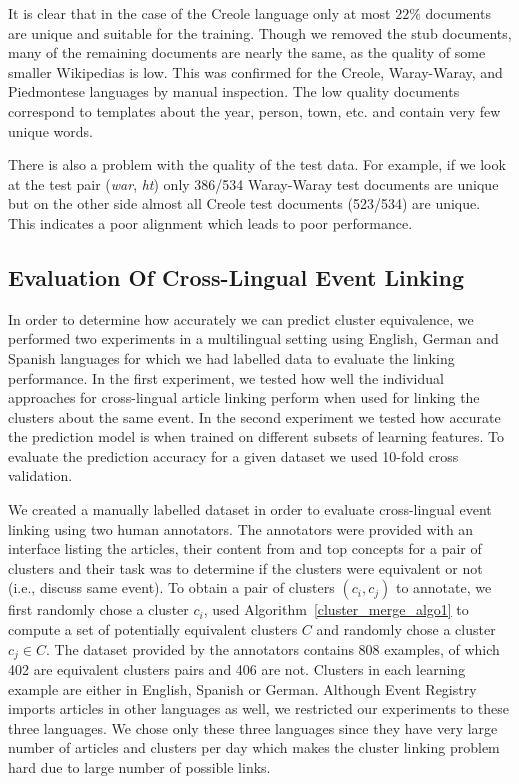 It is clear that in the case of the Creole language only at most $22\%$ documents are unique and suitable for the training. Though we removed the stub documents, many of the remaining documents are nearly the same, as the quality of some smaller Wikipedias is low. This was confirmed for the Creole, Waray-Waray, and Piedmontese languages by manual inspection. The low quality documents correspond to templates about the year, person, town, etc. and contain very few unique words.

There is also a problem with the quality of the test data. For example, if we look at the test pair (\emph{war}, \emph{ht}) only 386/534 Waray-Waray test documents are unique but on the other side almost all Creole test documents (523/534) are unique. This indicates a poor alignment which leads to poor performance.

\subsection{Evaluation Of Cross-Lingual Event Linking}
In order to determine how accurately we can predict cluster equivalence, we performed two experiments in a multilingual setting using English, German and Spanish languages for which we had labelled data to evaluate the linking performance. In the first experiment, we tested how well  the individual approaches for cross-lingual article linking perform when used for linking the clusters about the same event. In the second experiment we tested how accurate the prediction model is when trained on different subsets of learning features. To evaluate the prediction accuracy for a given dataset we used 10-fold cross validation.

We created a manually labelled dataset in order to evaluate cross-lingual event linking using two human annotators. The annotators were provided with an interface listing the articles, their content from and top concepts for a pair of clusters and their task was to determine if the clusters were equivalent or not (i.e., discuss same event). To obtain a pair of clusters $(c_i, c_j)$ to annotate, we first randomly chose a cluster $c_i$, used Algorithm~\ref{cluster_merge_algo1} to compute a set of potentially equivalent clusters $C$ and randomly chose a cluster $c_j \in C$. The dataset provided by the annotators contains 808 examples, of which 402 are equivalent clusters pairs and 406 are not. Clusters in each learning example are either in English, Spanish or German. Although Event Registry imports articles in other languages as well, we restricted our experiments to these three languages. We chose only these three languages since they have very large number of articles and clusters per day which makes the cluster linking problem hard due to large number of possible links.

